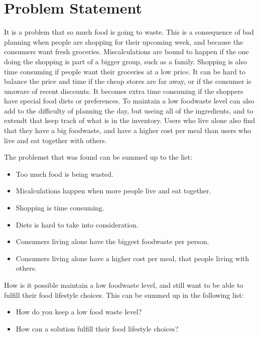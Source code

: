 \chapter{Problem Statement}
It is a problem that so much food is going to waste.
This is a consequence of bad planning when people are shopping for their upcoming week, and because the consumers want fresh groceries.
Miscalculations are bound to happen if the one doing the shopping is part of a bigger group, such as a family.
Shopping is also time consuming if people want their groceries at a low price.
It can be hard to balance the price and time if the cheap stores are far away, or if the consumer is unaware of recent discounts.
It becomes extra time consuming if the shoppers have special food diets or preferences.
To maintain a low foodwaste level can also add to the difficulty of planning the day, but useing all of the ingredients, and to extendt that keep track of what is in the inventory.
Users who live alone also find that they have a big foodwaste, and have a higher cost per meal than users who live and eat together with others.

The problemst that was found can be summed up to the list:

\begin{itemize}
    \item Too much food is being wasted.
    \item Micalculations happen when more people live and eat together.
    \item Shopping is time consuming.
    \item Diets is hard to take into consideration.
    \item Consumers living alone have the biggest foodwaste per person.
    \item Consumers living alone have a higher cost per meal, that people living with others.
\end{itemize}

How is it possible maintain a low foodwaste level, and still want to be able to fulfill their food lifestyle choices. This can be summed up in the following list:

\begin{itemize}
	\item How do you keep a low food waste level?
	\item How can a solution fulfill their food lifestyle choices?
\end{itemize}
